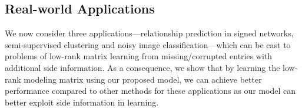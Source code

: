 \documentclass[twoside,11pt]{article}
\begin{document}

\subsection{Real-world Applications}
We now consider three applications---relationship prediction in signed networks, semi-supervised clustering
and noisy image classification---which can be cast to problems of low-rank matrix learning
from missing/corrupted entries with additional side information.
As a consequence, we show that by learning the low-rank modeling matrix
using our proposed model,
we can achieve better performance compared to other methods for these applications
as our model can better exploit side information in learning.
\end{document}
